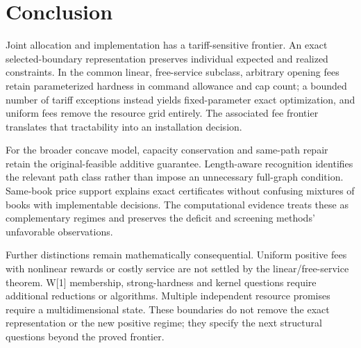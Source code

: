 \documentclass[11pt,letterpaper]{article}
\theoremstyle{definition}\newtheorem{remark}[theorem]{Remark}
\begin{document}
\section{Conclusion}
Joint allocation and implementation has a tariff-sensitive frontier. An exact selected-boundary representation preserves individual expected and realized constraints. In the common linear, free-service subclass, arbitrary opening fees retain parameterized hardness in command allowance and cap count; a bounded number of tariff exceptions instead yields fixed-parameter exact optimization, and uniform fees remove the resource grid entirely. The associated fee frontier translates that tractability into an installation decision.

For the broader concave model, capacity conservation and same-path repair retain the original-feasible additive guarantee. Length-aware recognition identifies the relevant path class rather than impose an unnecessary full-graph condition. Same-book price support explains exact certificates without confusing mixtures of books with implementable decisions. The computational evidence treats these as complementary regimes and preserves the deficit and screening methods' unfavorable observations.

Further distinctions remain mathematically consequential. Uniform positive fees with nonlinear rewards or costly service are not settled by the linear/free-service theorem. W[1] membership, strong-hardness and kernel questions require additional reductions or algorithms. Multiple independent resource promises require a multidimensional state. These boundaries do not remove the exact representation or the new positive regime; they specify the next structural questions beyond the proved frontier.
\end{document}
